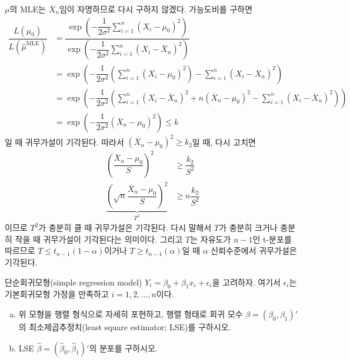 \documentclass[answers]{exam}
\begin{document}
\begin{questions}
    \begin{solution}
      $\mu$의 MLE는 $\overline{X}_{n}$임이 자명하므로 다시 구하지 않겠다. 가능도비를 구하면
      \begin{align}
        \dfrac{L\left(\mu_{0}\right)}{L\left(\widehat{\mu}^{\text{MLE}}\right)} &= \dfrac{\exp\left(-\dfrac{1}{2\sigma^{2}}\sum_{i=1}^{n}\left(X_{i}-\mu_{0}\right)^{2}\right)}{\exp\left(-\dfrac{1}{2\sigma^{2}}\sum_{i=1}^{n}\left(X_{i}-\overline{X}_{n}\right)^{2}\right)}\\
        &= \exp\left(-\dfrac{1}{2\sigma^{2}}\left(\sum_{i=1}^{n}\left(X_{i}-\mu_{0}\right)^{2}\right)-\sum_{i=1}^{n}\left(X_{i}-\overline{X}_{n}\right)^{2} \right)\\
        &= \exp\left(-\dfrac{1}{2\sigma^{2}}\left(\sum_{i=1}^{n}\left(X_{i}-\overline{X}_{n}\right)^{2}+n\left(\overline{X}_{n}-\mu_{0}\right)^{2}-\sum_{i=1}^{n}\left(X_{i}-\overline{X}_{n}\right)^{2}\right)\right)\\
        &= \exp\left(-\dfrac{1}{2\sigma^{2}}\left(\overline{X}_{n}-\mu_{0}\right)^{2}\right)\leq k
      \end{align}
      일 때 귀무가설이 기각된다. 따라서 $\left(\overline{X}_{n}-\mu_{0}\right)^{2}\geq k_{2}$일 때, 다시 고치면
      \begin{align}
        \left(\dfrac{\overline{X}_{n}-\mu_{0}}{S}\right)^{2} &\geq \dfrac{k_{2}}{S^{2}}\\
        \underbrace{\left(\sqrt{n}\dfrac{\overline{X}_{n}-\mu_{0}}{S}\right)^{2}}_{T^{2}} &\geq n\dfrac{k_{2}}{S^{2}}
      \end{align}
      이므로 $T^{2}$가 충분히 클 때 귀무가설은 기각된다. 다시 말해서 $T$가 충분히 크거나 충분히 작을 때 귀무가설이 기각된다는 의미이다. 그리고 $T$는 자유도가 $n-1$인 t-분포를 따르므로 $T\leq t_{n-1}\left(1-\alpha\right)$이거나 $T\geq t_{n-1}\left(\alpha\right)$일 때 $\alpha$ 신뢰수준에서 귀무가설은 기각된다.
    \end{solution}
    \newpage
    \question
    단순회귀모형(simple regression model) $Y_{i}=\beta_{0}+\beta_{1}x_{i}+\epsilon_{i}$을 고려하자. 여기서 $\epsilon_{i}$는 기본회귀모형 가정을 만족하고 $i=1,2,\ldots,n$이다.
    \begin{enumerate}[(a)]
      \item 위 모형을 행렬 형식으로 자세히 포현하고, 행렬 형태로 회귀 모수 $\beta=\left(\beta_{0},\beta_{1}\right)'$의 최소제곱추정치(least square estimator; LSE)를 구하시오.
      \item LSE $\widehat{\beta}=\left(\widehat{\beta}_{0},\widehat{\beta}_{1}\right)'$의 분포를 구하시오.

\end{enumerate}
\end{questions}
\end{document}

